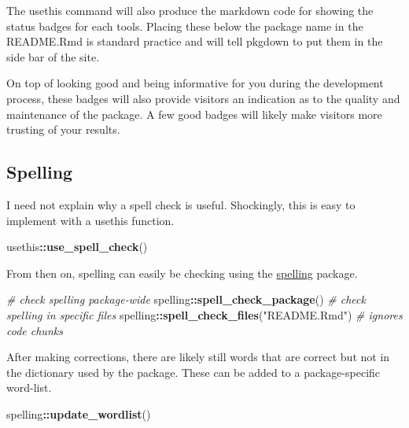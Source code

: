 \documentclass[]{book}
\newenvironment{Shaded}{\begin{snugshade}}{\end{snugshade}}
\newcommand{\KeywordTok}[1]{\textcolor[rgb]{0.13,0.29,0.53}{\textbf{#1}}}
\newcommand{\StringTok}[1]{\textcolor[rgb]{0.31,0.60,0.02}{#1}}
\newcommand{\CommentTok}[1]{\textcolor[rgb]{0.56,0.35,0.01}{\textit{#1}}}
\newcommand{\OperatorTok}[1]{\textcolor[rgb]{0.81,0.36,0.00}{\textbf{#1}}}
\newcommand{\NormalTok}[1]{#1}
\begin{document}
The usethis command will also produce the markdown code for showing the
status badges for each tools. Placing these below the package name in
the README.Rmd is standard practice and will tell pkgdown to put them in
the side bar of the site.

On top of looking good and being informative for you during the
development process, these badges will also provide visitors an
indication as to the quality and maintenance of the package. A few good
badges will likely make visitors more trusting of your results.

\subsection{Spelling}\label{spelling}

I need not explain why a spell check is useful. Shockingly, this is easy
to implement with a usethis function.

\begin{Shaded}
\begin{Highlighting}[]
\NormalTok{usethis}\OperatorTok{::}\KeywordTok{use_spell_check}\NormalTok{()}
\end{Highlighting}
\end{Shaded}

From then on, spelling can easily be checking using the
\href{https://github.com/ropensci/spelling}{spelling} package.

\begin{Shaded}
\begin{Highlighting}[]
\CommentTok{# check spelling package-wide}
\NormalTok{spelling}\OperatorTok{::}\KeywordTok{spell_check_package}\NormalTok{()}
\CommentTok{# check spelling in specific files}
\NormalTok{spelling}\OperatorTok{::}\KeywordTok{spell_check_files}\NormalTok{(}\StringTok{"README.Rmd"}\NormalTok{)  }\CommentTok{# ignores code chunks}
\end{Highlighting}
\end{Shaded}

After making corrections, there are likely still words that are correct
but not in the dictionary used by the package. These can be added to a
package-specific word-list.

\begin{Shaded}
\begin{Highlighting}[]
\NormalTok{spelling}\OperatorTok{::}\KeywordTok{update_wordlist}\NormalTok{()}
\end{Highlighting}
\end{Shaded}
\end{document}
